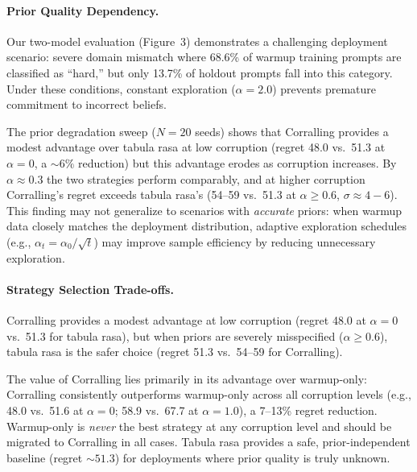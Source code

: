 \paragraph{Prior Quality Dependency.}
Our two-model evaluation (Figure~3) demonstrates a challenging deployment
scenario: severe domain mismatch where 68.6\% of warmup training prompts are
classified as ``hard,'' but only 13.7\% of holdout prompts fall into this
category.
Under these conditions, constant exploration ($\alpha{=}2.0$) prevents
premature commitment to incorrect beliefs.

The prior degradation sweep ($N{=}20$ seeds) shows that Corralling provides
a modest advantage over tabula rasa at low corruption (regret 48.0 vs.\
51.3 at $\alpha{=}0$, a ${\sim}6\%$ reduction) but this advantage erodes
as corruption increases.  By $\alpha{\approx}0.3$ the two strategies perform
comparably, and at higher corruption Corralling's regret exceeds tabula
rasa's (54--59 vs.\ 51.3 at $\alpha \geq 0.6$, $\sigma \approx 4{-}6$).
This finding may not generalize to scenarios with \emph{accurate} priors: when
warmup data closely matches the deployment distribution, adaptive exploration
schedules (e.g., $\alpha_t = \alpha_0/\sqrt{t}$) may improve sample efficiency
by reducing unnecessary exploration.

\paragraph{Strategy Selection Trade-offs.}
Corralling provides a modest advantage at low corruption (regret
48.0 at $\alpha{=}0$ vs.\ 51.3 for tabula rasa), but when priors are severely
misspecified ($\alpha \geq 0.6$), tabula rasa is the safer choice (regret
51.3 vs.\ 54--59 for Corralling).

The value of Corralling lies primarily in its advantage over warmup-only:
Corralling consistently outperforms warmup-only across all corruption levels
(e.g., 48.0 vs.\ 51.6 at $\alpha{=}0$; 58.9 vs.\ 67.7 at $\alpha{=}1.0$),
a 7--13\% regret reduction.
Warmup-only is \emph{never} the best strategy at any corruption level and
should be migrated to Corralling in all cases.  Tabula rasa provides a
safe, prior-independent baseline (regret ${\sim}51.3$) for deployments where
prior quality is truly unknown.

